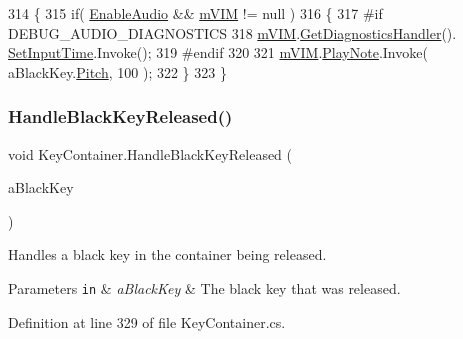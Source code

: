\begin{DoxyCode}
314     \{
315         \textcolor{keywordflow}{if}( \hyperlink{group___key_contain_pub_var_ga5dc9b1349f8fafc894c7f739f6780a8c}{EnableAudio} && \hyperlink{group___key_contain_priv_var_ga57ee3824e2f284403bb70ad9c4dfd307}{mVIM} != null )
316         \{
317 \textcolor{preprocessor}{            #if DEBUG\_AUDIO\_DIAGNOSTICS}
318                 \hyperlink{group___key_contain_priv_var_ga57ee3824e2f284403bb70ad9c4dfd307}{mVIM}.\hyperlink{group___v_i_m_pub_func_ga7e60bc3c5464d8f34f0d56def675bcc6}{GetDiagnosticsHandler}().
      \hyperlink{group___audio_testing_a133561901c2aef535b2f3c098e55b959}{SetInputTime}.Invoke();
319 \textcolor{preprocessor}{            #endif}
320 
321             \hyperlink{group___key_contain_priv_var_ga57ee3824e2f284403bb70ad9c4dfd307}{mVIM}.\hyperlink{group___v_i_m_events_gaa21021c13a8c9d13cbf374d5bf9d68fa}{PlayNote}.Invoke( aBlackKey.\hyperlink{group___black_key_pub_var_gad233c456182c9cef7c01486484940439}{Pitch}, 100 );
322         \}
323     \}
\end{DoxyCode}
\mbox{\label{group___key_contain_handlers_ga5a0c5565c5ebc6026b3122f487e51704}} 
\subsubsection{\texorpdfstring{Handle\+Black\+Key\+Released()}{HandleBlackKeyReleased()}}
{\footnotesize\ttfamily void Key\+Container.\+Handle\+Black\+Key\+Released (\begin{DoxyParamCaption}\item[{\hyperlink{class_black_key}{Black\+Key}}]{a\+Black\+Key }\end{DoxyParamCaption})\hspace{0.3cm}{\ttfamily [private]}}



Handles a black key in the container being released. 


\begin{DoxyParams}[1]{Parameters}
\mbox{\tt in}  & {\em a\+Black\+Key} & The black key that was released. \\
\hline
\end{DoxyParams}


Definition at line 329 of file Key\+Container.\+cs.




